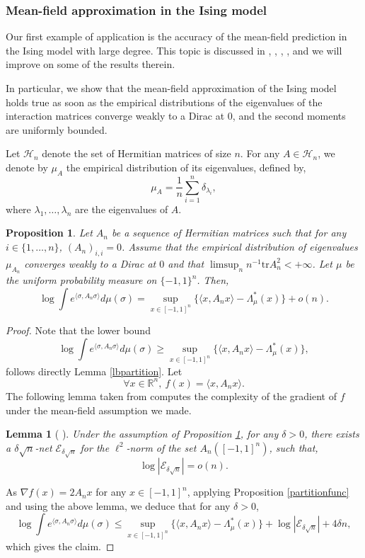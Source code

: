\documentclass[aop,preprint]{imsart}
\newcommand\RR{\mathbb{R}}
\newcommand\tr{\mathrm{tr}}
\numberwithin{equation}{section}
\theoremstyle{definition}
\theoremstyle{plain}
\newtheorem{Pro}[Def]{Proposition}
\newtheorem{Lem}[Def]{Lemma}
\theoremstyle{remark}
\begin{document}
\subsubsection{Mean-field approximation in the Ising model}\label{Ising}
Our first example of application is the accuracy of the mean-field prediction in the Ising model with large degree. This topic is discussed in \cite{BM},  \cite[section 1.3]{Eldan}, \cite{JKM}, \cite{JKR}, and we will improve on some of the results therein.

 In particular, we show that the mean-field approximation of the Ising model holds true as soon as the empirical distributions of the eigenvalues of the interaction matrices converge weakly to a Dirac at $0$, and the second moments are uniformly bounded. 

Let $\mathcal{H}_n$ denote the set of Hermitian matrices of size $n$. For any $A\in\mathcal{H}_n$, we denote by $\mu_A$ the empirical distribution of its eigenvalues, defined by,
$$   \mu_A = \frac{1}{n} \sum_{i=1}^n \delta_{\lambda_i},$$
where $\lambda_1,\ldots ,\lambda_n$ are the eigenvalues of $A$.
\begin{Pro}\label{meanfield}
Let $A_n$ be a sequence of Hermitian matrices such that for any $i\in\{1,\ldots ,n\}$,  $(A_n)_{i,i} =0$. Assume that the empirical distribution of eigenvalues $\mu_{A_n}$ converges weakly to a Dirac at $0$ and that  $\limsup_n n^{-1} \tr A_n^2 <+\infty$. 
Let $\mu$ be the uniform probability  measure on $\{-1,1\}^n$. Then,
$$ \log \int e^{\langle \sigma , A_n\sigma \rangle} d \mu(\sigma)= \sup_{ x \in [-1,1]^n} \big\{ \langle x, A_n x\rangle - \Lambda^*_{\mu}(x)\big\} + o(n).$$

\end{Pro}
\begin{proof}Note that the lower bound 
$$ \log \int e^{\langle \sigma , A_n\sigma \rangle}d\mu(\sigma) \geq \sup_{ x \in [-1,1]^n} \big\{ \langle x, A_n x\rangle - \Lambda^*_{\mu}(x)\big\}, 
$$ 
follows directly  Lemma \ref{lbpartition}.
Let 
$$ \forall x \in \RR^n, \ f(x) = \langle x, A_n x\rangle.$$
The following lemma taken from \cite[Lemma 3.4, Remark 4.1]{BM} computes the complexity of the gradient of $f$ under the mean-field assumption we made.

\begin{Lem}[  {\cite[Lemma 3.4, Remark 4.1]{BM}} ]\label{complexIsing}
Under the assumption of Proposition \ref{meanfield}, for any $\delta>0$, there exists a $\delta\sqrt{n}$-net $\mathcal{E}_{\delta\sqrt{n}}$ for the $\ell^2$-norm of the set $A_n([-1,1]^n)$, such that,
$$ \log |\mathcal{E}_{\delta\sqrt{n}}| = o(n).$$
\end{Lem}

As $\nabla f(x) = 2A_nx$ for any $x\in[-1,1]^n$, applying Proposition \ref{partitionfunc} and using the above lemma, we deduce that for any $\delta>0$, 
\begin{equation} \label{Isingbound}\log \int e^{\langle \sigma, A_n \sigma\rangle} d\mu(\sigma) \leq \sup_{x\in [-1,1]^n}\{ \langle x, A_n x\rangle -\Lambda^*_{\mu}(x) \} + \log |\mathcal{E}_{\delta\sqrt{n}}| + 4\delta n,\end{equation}
which gives the claim.
\end{proof}
\end{document}
